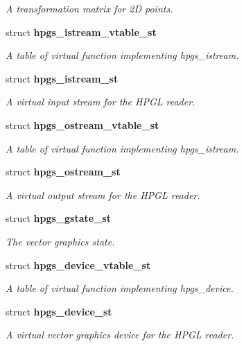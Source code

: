 \begin{DoxyCompactItemize}
\begin{DoxyCompactList}\small\item\em A transformation matrix for 2D points. \item\end{DoxyCompactList}\item 
struct {\bf hpgs\_\-istream\_\-vtable\_\-st}
\begin{DoxyCompactList}\small\item\em A table of virtual function implementing {\ttfamily hpgs\_\-istream}. \item\end{DoxyCompactList}\item 
struct {\bf hpgs\_\-istream\_\-st}
\begin{DoxyCompactList}\small\item\em A virtual input stream for the HPGL reader. \item\end{DoxyCompactList}\item 
struct {\bf hpgs\_\-ostream\_\-vtable\_\-st}
\begin{DoxyCompactList}\small\item\em A table of virtual function implementing {\ttfamily hpgs\_\-istream}. \item\end{DoxyCompactList}\item 
struct {\bf hpgs\_\-ostream\_\-st}
\begin{DoxyCompactList}\small\item\em A virtual output stream for the HPGL reader. \item\end{DoxyCompactList}\item 
struct {\bf hpgs\_\-gstate\_\-st}
\begin{DoxyCompactList}\small\item\em The vector graphics state. \item\end{DoxyCompactList}\item 
struct {\bf hpgs\_\-device\_\-vtable\_\-st}
\begin{DoxyCompactList}\small\item\em A table of virtual function implementing {\ttfamily hpgs\_\-device}. \item\end{DoxyCompactList}\item 
struct {\bf hpgs\_\-device\_\-st}
\begin{DoxyCompactList}\small\item\em A virtual vector graphics device for the HPGL reader. \item\end{DoxyCompactList}\item 

\end{DoxyCompactItemize}
